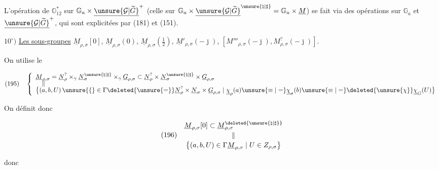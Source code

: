 L'opération de $\mathbb O_{12}^{*}$ sur
$\mathbb G_a\times\underline{\unsure{\mathcal G|\widetilde G}}^{+}$
(celle sur $\mathbb G_a\times\underline{\unsure{\mathcal G|\widetilde G}}^{\unsure{\natural|\sharp}}
=\mathbb G_a\times\underline M$) se fait via des opérations sur
$\mathbb G_a$ et $\underline{\unsure{\mathcal G|\widetilde G}}^{+}$, qui sont explicitées
 par (181) et (151).


$10^{\circ})$ \uline{Les sous-groupes}
$\underline M_{\rho,\sigma}[0]$, $\underline M_{\rho,\sigma}(0)$,
$\underline M_{\rho,\sigma}(\frac12)$,
$\underline M'_{\rho,\sigma}(-\bar\jmath)$,
$[M'''_{\rho,\sigma}(-\bar\jmath),M^{?}_{\rho,\sigma}(-\bar\jmath)]$.

On utilise le 

\[
(195)\quad
\left\{\begin{array}{l}
\underline M_{\rho,\sigma}
=\underline N_\rho^{?}\times_\gamma
 \underline N_\sigma^{\unsure{\natural|\sharp}}\times_\gamma
 \underline G_{\rho,\sigma}
\subset\underline N_\rho^{?}\times
 \underline N_\sigma^{\unsure{\natural|\sharp}}\times
 \underline G_{\rho,\sigma}
\\[-2pt]
\quad\Vert
\\[-2pt]
\bigl\{(a,b,U)\,\unsure{\{}\in
 \Gamma\deleted{\unsure{=}}\underline N_\rho^{?}
 \times\underline N_\sigma\times\underline G_{\rho,\sigma}
 \mid\underline\chi_\rho(a)\unsure{\equiv|=}
 \underline\chi_\sigma(b)\unsure{\equiv|=}
 \deleted{\unsure{\chi}}\underline\chi_G(U)\bigr\}
\end{array}\right.
\]

On définit donc

\[
(196)\quad\begin{gathered}
\underline M_{\rho,\sigma}[0]\subset
\underline M_{\rho,\sigma}^{\deleted{\unsure{\natural|\sharp}}}
\\[-2pt]
\Vert
\\[-2pt]
\bigl\{(a,b,U)\in\Gamma\underline M_{\rho,\sigma}
 \mid U\in Z_{\rho,\sigma}\bigr\}
\end{gathered}
\]


donc

